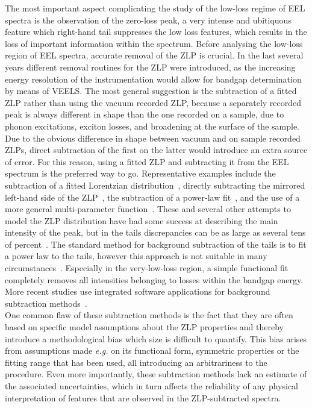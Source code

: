 The most important aspect complicating the study of the low-loss regime of EEL spectra 
is the observation of the zero-loss peak, a very intense and ubitiquous feature 
which right-hand tail suppresses the low loss features, which results in the loss
of important information within the spectrum.
%
Before analysing the low-loss region of EEL spectra, accurate removal of the
ZLP is crucial. 
%
In the last several years different removal routines for the ZLP were introduced, 
as the increasing energy resolution of the instrumentation would allow for bandgap 
determination by means of VEELS. 
%
The most general suggestion is the subtraction of a fitted ZLP rather than 
using the vacuum recorded ZLP, because a separately recorded peak is always 
different in shape than the one recorded on a sample, due to phonon excitations, 
exciton losses, and broadening at the surface of the sample.
%
Due to the obvious difference in shape between vacuum and on sample recorded ZLPs, 
direct subtraction of the first on the latter would introduce an extra
source of error. 
%
For this reason, using a fitted ZLP and subtracting it from the EEL spectrum 
is the preferred way to go.
%
Representative examples include the subtraction of a fitted Lorentzian distribution~\cite{Dorneich:1998},
directly subtracting the mirrored left-hand side of the ZLP~\cite{Lazar:2003},
the subtraction of a power-law fit~\cite{Erni:2005}, and the use of a
more general multi-parameter function~\cite{Benthem:2001}.
%
These and several other attempts to model the ZLP distribution 
have had some success at describing the main intensity of the peak, 
but in the tails discrepancies can be as large as several tens of percent~\cite{Bangert:2003}.
%
The standard method for background subtraction of the tails
is to fit a power law to the tails, however this approach is not suitable in
many circumstances~\cite{Hachtel:2018, Tenailleau:1992, Reed:2002, Bosman:2006}.
%
Especially in the very-low-loss region, a simple functional fit completely
removes all intensities belonging to losses within the bandgap energy.
%
More recent studies use integrated software applications for background subtraction 
methods~\cite{Egerton:10.1016/S0304-3991(01)00155-3, Held:2020, Granerod:2018, Fung:2020}.\\

One common flaw of these subtraction methods is the fact that they are often based on specific
model assumptions about the ZLP properties and thereby introduce a methodological
bias which size is difficult to quantify. 
%
This bias arises from assumptions made {\it e.g.} on its functional form, symmetric 
properties or the fitting range that has been used, all introducing an arbitrariness
to the procedure.
%
Even more importantly, these subtraction methods lack an estimate of the associated uncertainties, 
which in turn affects the reliability of any physical interpretation of features that are observed
in the ZLP-subtracted spectra. 

